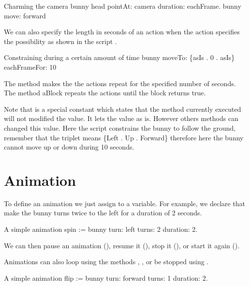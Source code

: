 \begin{scriptwithtitle}{Charming the  camera}\label{scr:eachFrame}
bunny head pointAt: camera duration: eachFrame.
bunny move: forward
\end{scriptwithtitle}

We can also specify the length in seconds of an action when the action specifies the  
possibility as shown in the script .

\begin{scriptwithtitle}{Constraining during a certain amount of time}\label{scr:eachFrameFor}
bunny moveTo: \{asIs . 0 . asIs\} eachFrameFor: 10
\end{scriptwithtitle}

The method  makes the the actions repeat for the specified 
number of seconds. The method  aBlock repeats the actions 
until the block returns true.

Note that  is a special constant which states that the method currently executed 
will not modified the value. It lets the value as is. However others methods can changed this value. 
Here the script constrains the bunny to follow the ground, remember that the triplet means \{Left . Up . Forward\} therefore here the bunny cannot move up or down during 10 seconds. 


\section{Animation}\label{sec:animation}
To define an animation we just assign to a variable. For example, we declare 
that  make the bunny turns twice to the left for a duration of 2 seconds. 

\begin{scriptwithtitle}{A simple animation}
spin := bunny turn: left turns: 2 duration: 2.
\end{scriptwithtitle}

We can then pause an animation (), resume it (), stop it (), or start it again ().

Animations can also loop using the methods , , or be stopped using . 

\begin{scriptwithtitle}{A simple animation}
flip := bunny turn: forward turns: 1 duration: 2.
\end{scriptwithtitle}

